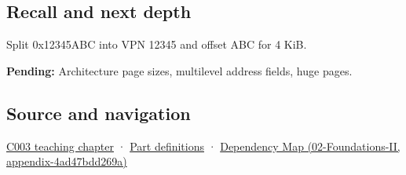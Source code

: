 \subsection{Recall and next depth}\label{appendix-0c67cd5bf30a-recall-and-next-depth}

Split 0x12345ABC into VPN 12345 and offset ABC for 4 KiB.

\textbf{Pending:} Architecture page sizes, multilevel address fields, huge pages.

\subsection{Source and navigation}\label{appendix-0c67cd5bf30a-source-and-navigation}

\hyperref[01-foundations-i-ch002-where-the-bytes-live]{C003 teaching chapter} · \hyperref[appendix-fd090d982a15-m003---parts-41-60]{Part definitions} · \href{../02-Foundations-II/main.pdf\#nameddest=appendix-4ad47bdd269a}{Dependency Map (02-Foundations-II, appendix-4ad47bdd269a)}
